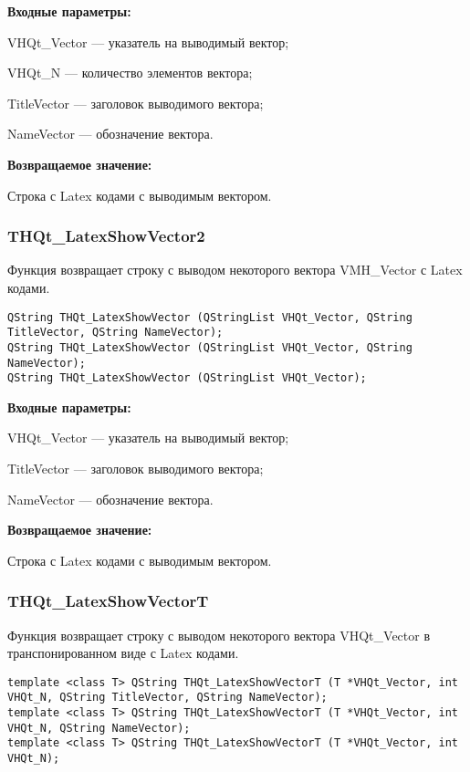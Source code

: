 \documentclass[a4paper,12pt]{article}
\begin{document}
\textbf{Входные параметры:}
 
VHQt\_Vector --- указатель на выводимый вектор;
 
VHQt\_N --- количество элементов вектора;
 
TitleVector --- заголовок выводимого вектора;
 
NameVector --- обозначение вектора.
	
\textbf{Возвращаемое значение:}

Строка с Latex кодами с выводимым вектором.


\subsubsection{THQt\_LatexShowVector2}\label{THQt_LatexShowVector2}

Функция возвращает строку с выводом некоторого вектора VMH\_Vector с Latex кодами.


\begin{lstlisting}[label=code_syntax_THQt_LatexShowVector2,caption=Синтаксис]
QString THQt_LatexShowVector (QStringList VHQt_Vector, QString TitleVector, QString NameVector);
QString THQt_LatexShowVector (QStringList VHQt_Vector, QString NameVector);
QString THQt_LatexShowVector (QStringList VHQt_Vector);
\end{lstlisting}

\textbf{Входные параметры:}
 
VHQt\_Vector --- указатель на выводимый вектор;
 
TitleVector --- заголовок выводимого вектора;
 
NameVector --- обозначение вектора.
	
\textbf{Возвращаемое значение:}

Строка с Latex кодами с выводимым вектором.


\subsubsection{THQt\_LatexShowVectorT}\label{THQt_LatexShowVectorT}

Функция возвращает строку с выводом некоторого вектора VHQt\_Vector в транспонированном виде с Latex кодами.


\begin{lstlisting}[label=code_syntax_THQt_LatexShowVectorT,caption=Синтаксис]
template <class T> QString THQt_LatexShowVectorT (T *VHQt_Vector, int VHQt_N, QString TitleVector, QString NameVector);
template <class T> QString THQt_LatexShowVectorT (T *VHQt_Vector, int VHQt_N, QString NameVector);
template <class T> QString THQt_LatexShowVectorT (T *VHQt_Vector, int VHQt_N);
\end{lstlisting}
\end{document}
